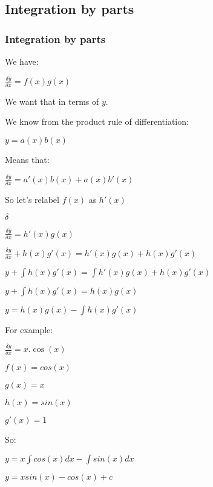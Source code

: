 
\subsection{Integration by parts}

\subsubsection{Integration by parts}

We have:

$\frac{\delta y}{\delta x}=f(x)g(x)$

We want that in terms of \(y\).

We know from the product rule of differentiation:

$y=a(x)b(x)$

Means that:

$\frac{\delta y}{\delta x}=a'(x)b(x)+a(x)b'(x)$

So let's relabel \(f(x)\) as \(h'(x)\)

$\delta$

$\frac{\delta y}{\delta x}=h'(x)g(x)$

$\frac{\delta y}{\delta x}+h(x)g'(x)=h'(x)g(x)+h(x)g'(x)$

$y+\int h(x)g'(x)=\int h'(x)g(x)+h(x)g'(x)$

$y+\int h(x)g'(x)=h(x)g(x)$

$y=h(x)g(x)-\int h(x)g'(x)$

For example:

$\frac{\delta y}{\delta x}=x.\cos(x)$

$f(x)=cos(x)$

$g(x)=x$

$h(x)=sin(x)$

$g'(x)=1$

So:

$y=x\int cos(x) dx-\int sin(x)dx$

$y=xsin(x)-cos(x)+c$

